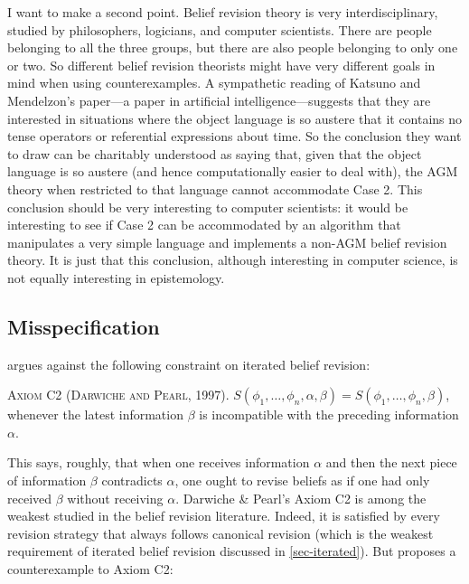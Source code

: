 I want to make a second point. Belief revision theory is very interdisciplinary, studied by philosophers, logicians, and computer scientists. There are people belonging to all the three groups, but there are also people belonging to only one or two. So different belief revision theorists might have very different goals in mind when using counterexamples. A sympathetic reading of Katsuno and Mendelzon's paper---a paper in artificial intelligence---suggests that they are interested in situations where the object language is so austere that it contains no tense operators or referential expressions about time. So the conclusion they want to draw can be charitably understood as saying that, given that the object language is so austere (and hence computationally easier to deal with), the AGM theory when restricted to that language cannot accommodate Case 2.  This conclusion should be very interesting to computer scientists: it would be interesting to see if Case 2 can be accommodated by an algorithm that manipulates a very simple language and implements a non-AGM belief revision theory. It is just that this conclusion, although interesting in computer science, is not equally interesting in epistemology.


\subsection{Misspecification}\label{sec-misspecification}


\citet{stalnaker2009iterated} argues against the following constraint on iterated belief revision: \op

	\xm \textsc{Axiom C2 (Darwiche and Pearl, 1997).} $S(\phi_1, \ldots, \phi_n, \alpha, \beta) = S(\phi_1, \ldots, \phi_n, \beta)$, whenever the latest information $\beta$ is incompatible with the preceding information $\alpha$.

\ed This says, roughly, that when one receives information $\alpha$ and then the next piece of information $\beta$ contradicts $\alpha$, one ought to revise beliefs as if one had only received $\beta$ without receiving $\alpha$. Darwiche \& Pearl's Axiom C2 is among the weakest studied in the belief revision literature. Indeed, it is satisfied by every revision strategy that always follows canonical revision (which is the weakest requirement of iterated belief revision discussed in \autoref{sec-iterated}). But \citet{stalnaker2009iterated} proposes a counterexample to Axiom C2: \op

